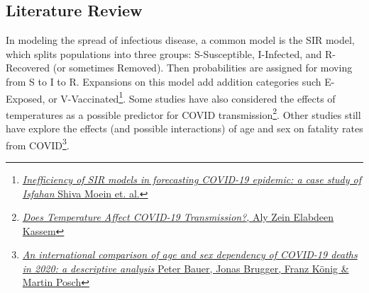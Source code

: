 \documentclass[11pt]{article}
\begin{document}
%
%
%
%
%
%
%
%
%
%
%
%

\subsection{Literature Review}

In modeling the spread of infectious disease, a common model is the SIR model, which splits populations into three groups: S-Susceptible, I-Infected, and R-Recovered (or sometimes Removed). Then probabilities are assigned for moving from S to I to R. Expansions on this model add addition categories such E-Exposed, or V-Vaccinated\footnote{ \href{https://www.nature.com/articles/s41598-021-84055-6}{\textit{Inefficiency of SIR models in forecasting COVID-19 epidemic: a case study of Isfahan} Shiva Moein et. al.}}. Some studies have also considered the effects of temperatures as a possible predictor for COVID transmission\footnote{\href{https://www.ncbi.nlm.nih.gov/pmc/articles/PMC7793668/}{\textit{Does Temperature Affect COVID-19 Transmission?}, Aly Zein Elabdeen Kassem}}. Other studies still have explore the effects (and possible interactions) of age and sex on fatality rates from COVID\footnote{\href{https://www.nature.com/articles/s41598-021-97711-8}{\textit{An international comparison of age and sex dependency of COVID-19 deaths in 2020: a descriptive analysis} Peter Bauer, Jonas Brugger, Franz K\"onig \& Martin Posch} }.
\end{document}
